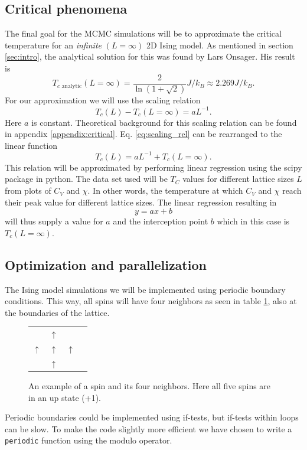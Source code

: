 \documentclass[english,notitlepage,reprint,nofootinbib]{revtex4-1}  %
\begin{document}
\subsection*{Critical phenomena}
The final goal for the MCMC simulations will be to approximate the critical temperature for an \textit{infinite} $(L=\infty)$ 2D Ising model. As mentioned in section \ref{sec:intro}, the analytical solution for this was found by Lars Onsager. His result is
\begin{equation*}
    T_{c \text{ analytic}}(L=\infty) = \frac{2}{\ln(1+\sqrt{2})}J/k_B \approx 2.269 J/k_B.
\end{equation*}
For our approximation we will use the scaling relation
\begin{equation}
    T_c(L) -T_c(L=\infty) = aL^{-1}. \label{eq:scaling_rel}
\end{equation}
Here $a$ is constant. Theoretical background for this scaling relation can be found in appendix \ref{appendix:critical}. Eq. \ref{eq:scaling_rel} can be rearranged to the linear function
\begin{equation}
    T_c(L) = aL^{-1} + T_c(L=\infty). \label{eq:scaling_linear}
\end{equation}
This relation will be approximated by performing linear regression using the scipy package in python. The data set used will be $T_C$ values for different lattice sizes $L$ from plots of $C_V$ and $\chi$. In other words, the temperature at which $C_V$ and $\chi$ reach their peak value for different lattice sizes. The linear regression resulting in
\begin{equation}
    y = ax + b
\end{equation}
will thus supply a value for $a$ and the interception point $b$ which in this case is $T_c(L=\infty)$.

\subsection*{Optimization and parallelization}
The Ising model simulations we will be implemented using periodic boundary conditions. This way, all spins will have four neighbors as seen in table \ref{fig:neighbors}, also at the boundaries of the lattice.
\begin{figure}[H]
    \centering
    \begin{tabular}{llll}
                   & $\uparrow$ &            \\
        $\uparrow$ & $\uparrow$ & $\uparrow$ \\
                   & $\uparrow$ &
    \end{tabular}\label{fig:neighbors}
    \caption{An example of a spin and its four neighbors. Here all five spins are in an up state (+1).}
\end{figure}
Periodic boundaries could be implemented using if-tests, but if-tests within loops can be slow. To make the code slightly more efficient we have chosen to write a \texttt{periodic} function using the modulo operator.
\end{document}
